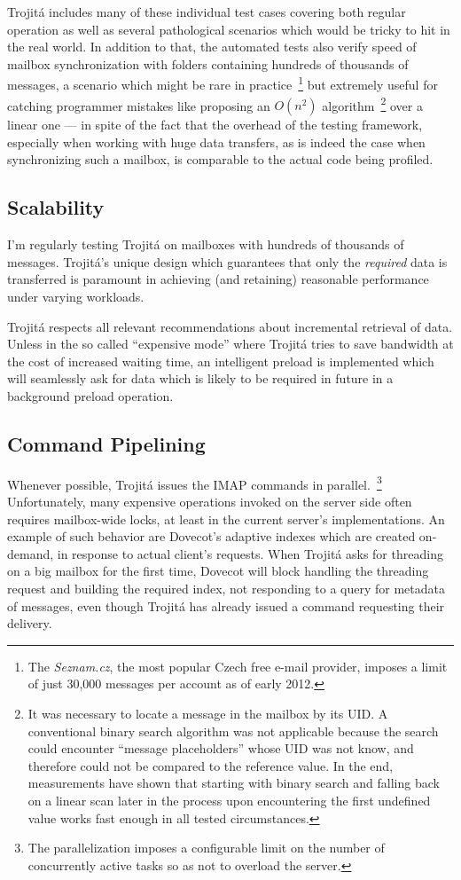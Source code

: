 \documentclass[trojita]{subfiles}
\begin{document}
Trojitá includes many of these individual test cases covering both regular operation as well as several pathological
scenarios which would be tricky to hit in the real world.  In addition to that, the automated tests also verify speed of
mailbox synchronization with folders containing hundreds of thousands of messages, a scenario which might be rare in
practice~\footnote{The {\em Seznam.cz}, the most popular Czech free e-mail provider, imposes a limit of just 30,000
messages per account as of early 2012.} but extremely useful for catching programmer mistakes like proposing an $O(n^2)$
algorithm~\footnote{It was necessary to locate a message in the mailbox by its UID.  A conventional binary search
algorithm was not applicable because the search could encounter ``message placeholders'' whose UID was not know, and
therefore could not be compared to the reference value.  In the end, measurements have shown that starting with binary
search and falling back on a linear scan later in the process upon encountering the first undefined value works fast
enough in all tested circumstances.} over a linear one --- in spite of the fact that the overhead of the testing
framework, especially when working with huge data transfers, as is indeed the case when synchronizing such a mailbox, is
comparable to the actual code being profiled.

\subsection{Scalability}

I'm regularly testing Trojitá on mailboxes with hundreds of thousands of messages.  Trojitá's unique design which
guarantees that only the {\em required} data is transferred is paramount in achieving (and retaining) reasonable
performance under varying workloads.

Trojitá respects all relevant recommendations about incremental retrieval of data.  Unless in the so called ``expensive
mode'' where Trojitá tries to save bandwidth at the cost of increased waiting time, an intelligent preload is
implemented which will seamlessly ask for data which is likely to be required in future in a background preload
operation.

\subsection{Command Pipelining}

Whenever possible, Trojitá issues the IMAP commands in parallel.~\footnote{The parallelization imposes a configurable
limit on the number of concurrently active tasks so as not to overload the server.}  Unfortunately, many expensive
operations invoked on the server side often requires mailbox-wide locks, at least in the current server's
implementations.  An example of such behavior are Dovecot's adaptive indexes \cite{dovecot-adaptive-indexes} which are
created on-demand, in response to actual client's requests.  When Trojitá asks for threading on a big mailbox for the
first time, Dovecot will block handling the threading request and building the required index, not responding to a query
for metadata of messages, even though Trojitá has already issued a command requesting their delivery.
\end{document}
